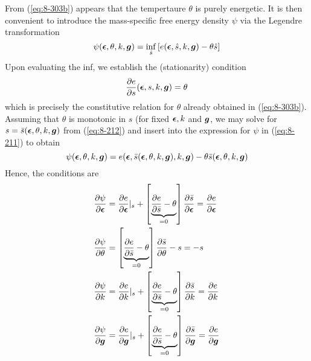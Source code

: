 From (\ref{eq:8-303b}) appears that the tempertaure $\theta$ is purely energetic. 
It is then convenient to introduce the mass-specific free energy density $\psi$
 via the Legendre transformation
\begin{equation}
    \psi(\bm{\epsilon},\theta,k,\bm {g}) = \inf_{\hat{s}}
    \left[ e(\bm{\epsilon},\hat{s},k,\bm {g}) - \theta \hat{s} \right]
\label{eq:8-211}
\end{equation}
Upon evaluating the inf, we establish the (stationarity) condition
\begin{equation}
    \frac{\partial e}{\partial s}(\bm{\epsilon},s,k,\bm {g}) = \theta
\label{eq:8-212}
\end{equation}
which is precisely the constitutive relation for $\theta$ already obtained 
in (\ref{eq:8-303b}). Assuming that $\theta$ is monotonic in $s$ (for fixed
$\bm{\epsilon},k$ and $\bm {g}$, we may solve for $s=\bar{s}(\bm{\epsilon},\theta,k,\bm {g})$ 
from (\ref{eq:8-212}) and insert into the expression for $\psi$ in (\ref{eq:8-211})
to obtain
\begin{equation}
    \psi(\bm{\epsilon},\theta,k,\bm {g}) = e(\bm{\epsilon},\bar{s}(\bm{\epsilon},\theta,k,\bm {g}),k,\bm {g}) - 
    \theta \bar{s}(\bm{\epsilon},\theta,k,\bm {g})
\label{eq:8-213}
\end{equation}
Hence, the conditions are
\begin{subequations}\label{eq:8-214}
    \begin{align}
    \frac{\partial \psi}{\partial \bm{\epsilon}}
    &=
    \frac{\partial e}{\partial \bm{\epsilon}}|_{s} + \left[\underbrace{\frac{\partial e}{\partial \bar{s}} - 
    \theta}_{=0} \right] \frac{\partial \bar{s}}{\partial \bm{\epsilon}} = \frac{\partial e}{\partial \bm{\epsilon}}
\label{eq:8-214a}\\
    \frac{\partial \psi}{\partial \theta}
    &=
    \left[\underbrace{\frac{\partial e}{\partial \bar{s}} - \theta}_{=0} \right] 
    \frac{\partial \bar{s}}{\partial \theta} -s  = -s
\label{eq:8-214b} \\
    \frac{\partial \psi}{\partial k}
    &=
    \frac{\partial e}{\partial k}|_{s} + \left[\underbrace{\frac{\partial e}{\partial \bar{s}} -
     \theta}_{=0} \right] \frac{\partial \bar{s}}{\partial k} = \frac{\partial e}{\partial k}
\label{eq:8-214c} \\
    \frac{\partial \psi}{\partial \bm {g}}
    &=
    \frac{\partial e}{\partial \bm {g}}|_{s} + \left[\underbrace{\frac{\partial e}{\partial \bar{s}} - 
    \theta}_{=0} \right] \frac{\partial \bar{s}}{\partial \bm {g}} = \frac{\partial e}{\partial \bm {g}}
\label{eq:8-214c}
    \end{align}
\end{subequations}
